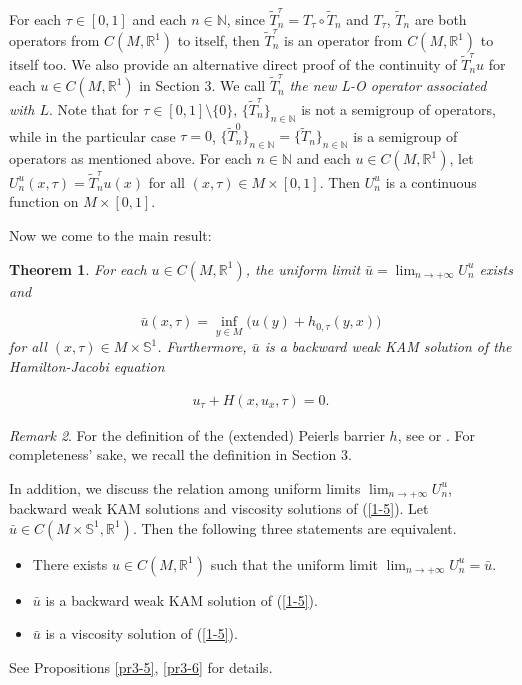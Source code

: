 \documentclass{amsart}[12pt]
\newtheorem{theorem}{Theorem}[section]
\theoremstyle{definition}
\theoremstyle{remark}
\newtheorem{remark}[theorem]{Remark}
\numberwithin{equation}{section}
\begin{document}
For each $\tau\in[0,1]$ and each $n\in \mathbb{N}$, since
$\tilde{T}_n^\tau=T_\tau\circ\tilde{T}_n$ and $T_\tau$,
$\tilde{T}_n$ are both operators from $C(M,\mathbb{R}^1)$ to
itself, then $\tilde{T}_n^\tau$ is an operator from
$C(M,\mathbb{R}^1)$ to itself too. We also provide an alternative
direct proof of the continuity of $\tilde{T}_n^\tau u$ for each
$u\in C(M,\mathbb{R}^1)$ in Section 3. We call $\tilde{T}_n^\tau$
{\em the new L-O operator associated with $L$}. Note that for
$\tau\in[0,1]\setminus\{0\}$,
$\{\tilde{T}_n^\tau\}_{n\in\mathbb{N}}$ is not a semigroup of
operators, while in the particular case $\tau=0$,
$\{\tilde{T}_n^0\}_{n\in\mathbb{N}}=\{\tilde{T}_n\}_{n\in\mathbb{N}}$
is a semigroup of operators as mentioned above. For each
$n\in\mathbb{N}$ and each $u\in C(M,\mathbb{R}^1)$, let
$U^u_n(x,\tau)=\tilde{T}_n^\tau u(x)$ for all $(x,\tau)\in
M\times[0,1]$. Then $U^u_n$ is a continuous function on
$M\times[0,1]$.

Now we come to the main result:

\begin{theorem}\label{th1}
For each $u\in C(M,\mathbb{R}^1)$, the uniform limit
$\bar{u}=\lim_{n\to+\infty}U^u_n$ exists and

\[
\bar{u}(x,\tau)=\inf_{y\in M}\big(u(y)+h_{0,\tau}(y,x)\big)
\]
for all $(x,\tau)\in M\times\mathbb{S}^1$. Furthermore, $\bar{u}$
is a backward weak KAM solution of the Hamilton-Jacobi equation

\begin{align}\label{1-5}
u_\tau+H(x,u_x,\tau)=0.
\end{align}
\end{theorem}

\begin{remark}
For the definition of the (extended) Peierls barrier $h$, see
\cite{Mat93} or \cite{Fat5,Ber,Con}. For completeness' sake, we
recall the definition in Section 3.
\end{remark}

In addition, we discuss the relation among uniform limits
$\lim_{n\to+\infty}U^u_n$, backward weak KAM solutions and
viscosity solutions of (\ref{1-5}). Let $\bar{u}\in
C(M\times\mathbb{S}^1,\mathbb{R}^1)$. Then the following three
statements are equivalent.

\begin{itemize}
    \item There exists $u\in C(M,\mathbb{R}^1)$ such that the uniform limit
           $\lim_{n\to+\infty}U^u_n=\bar{u}$.
    \item $\bar{u}$ is a backward weak KAM solution of
          (\ref{1-5}).
    \item $\bar{u}$ is a viscosity solution of (\ref{1-5}).
\end{itemize}
See Propositions \ref{pr3-5}, \ref{pr3-6} for details.
\end{document}
